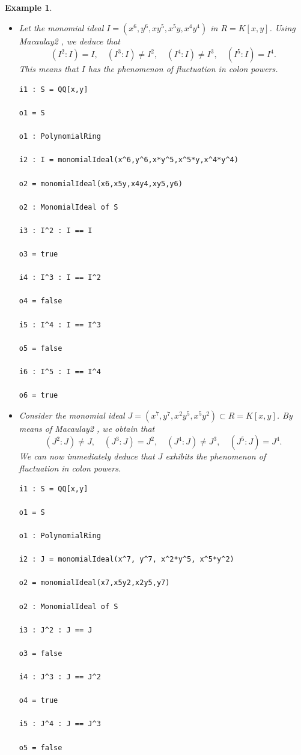 \documentclass[11pt]{amsart}
\newtheorem{example}[theorem]{Example}
\begin{document}
\begin{example} \label{Exam.Fluctuation}
\em{
\begin{itemize}
\item[(i)] Let  the  monomial ideal $I=(x^6, y^6, x y^5, x^5 y, x^4 y^4 )$ in $R=K[x,y]$.  
Using  \textit{Macaulay2} \cite{GS}, we deduce that 
$$(I^2 : I)= I, \quad  (I^3 : I)\neq I^2, \quad  (I^4 : I)\neq I^3, \quad  (I^5 : I)= I^4.$$
This  means that $I$ has the  phenomenon  of  fluctuation in colon powers.
\begin{verbatim}
i1 : S = QQ[x,y]

o1 = S

o1 : PolynomialRing

i2 : I = monomialIdeal(x^6,y^6,x*y^5,x^5*y,x^4*y^4)

o2 = monomialIdeal(x6,x5y,x4y4,xy5,y6)

o2 : MonomialIdeal of S

i3 : I^2 : I == I

o3 = true

i4 : I^3 : I == I^2

o4 = false

i5 : I^4 : I == I^3

o5 = false

i6 : I^5 : I == I^4

o6 = true
\end{verbatim}

\item[(ii)] Consider  the monomial ideal $J=(x^7, y^7, x^2 y^5, x^5 y^2) \subset R=K[x,y]$. By means of  \textit{Macaulay2} \cite{GS},  we obtain that 
$$(J^2 : J) \neq J, \quad (J^3 : J)= J^2, \quad (J^4 : J) \neq J^3, \quad  (J^5 : J) = J^4.$$
 We can now immediately deduce that $J$  exhibits the phenomenon of fluctuation in colon powers.
\begin{verbatim}
i1 : S = QQ[x,y]

o1 = S

o1 : PolynomialRing

i2 : J = monomialIdeal(x^7, y^7, x^2*y^5, x^5*y^2)

o2 = monomialIdeal(x7,x5y2,x2y5,y7)

o2 : MonomialIdeal of S

i3 : J^2 : J == J

o3 = false

i4 : J^3 : J == J^2

o4 = true

i5 : J^4 : J == J^3

o5 = false


\end{verbatim}
\end{itemize}}
\end{example}
\end{document}

